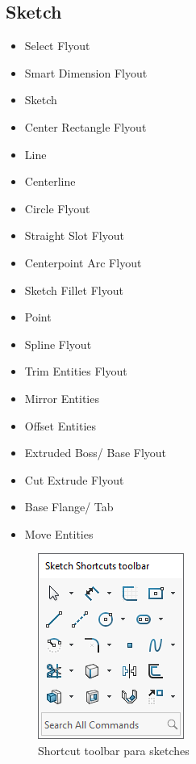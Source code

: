 \documentclass[12pt,letterpaper,final]{report}
\begin{document}
\subsection{Sketch}

\begin{itemize}
	\item Select Flyout
	\item Smart Dimension Flyout
	\item Sketch
	\item Center Rectangle Flyout
	\item Line
	\item Centerline
	\item Circle Flyout
	\item Straight Slot Flyout
	\item Centerpoint Arc Flyout
	\item Sketch Fillet Flyout
	\item Point
	\item Spline Flyout
	\item Trim Entities Flyout
	\item Mirror Entities
	\item Offset Entities
	\item Extruded Boss/ Base Flyout
	\item Cut Extrude Flyout
	\item Base Flange/ Tab
	\item Move Entities
\end{itemize}

\begin{figure}[H]
	\centering
	\includegraphics[width=0.45\linewidth, height=0.5\textheight,keepaspectratio]{Imagenes/solidworks_shortcutbars_06}
	\caption{Shortcut toolbar para sketches}
	\label{fig:solidworksshortcutbars06}
\end{figure}
\end{document}
